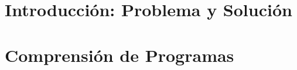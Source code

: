 \documentclass[a4paper,12pt]{report}
\begin{document}
%
%
%
%
%
%
\chapter{Introducción: Problema y Solución}

%
\chapter{Comprensión de Programas}

%
%
%
%
%
%
%
%
%
%
%
%

\end{document}
